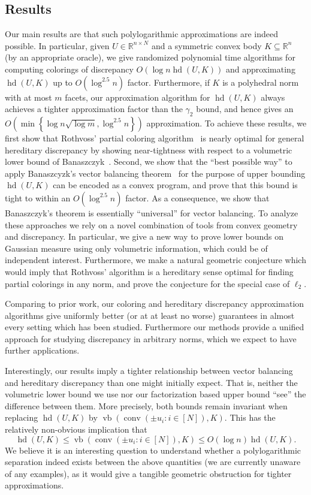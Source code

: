 \documentclass[11pt]{article}
\newcommand{\R}{{\mathbb{R}}}
\newcommand{\set}[1]{\left\{ #1 \right\}}
\DeclareMathOperator{\hd}{hd}
\DeclareMathOperator{\vb}{vb}
\DeclareMathOperator{\conv}{conv}
\begin{document}
\subsection{Results} 
Our main results are that such polylogarithmic approximations are indeed
possible. In particular, given $U \in \R^{n \times N}$ and a symmetric convex
body $K \subseteq \R^n$ (by an appropriate oracle), we give randomized
polynomial time algorithms for computing colorings of discrepancy $O(\log n
\hd(U,K))$ and approximating $\hd(U,K)$ up to $O(\log^{2.5} n)$ factor.
Furthermore, if $K$ is a polyhedral norm with at most $m$ facets, our
approximation algorithm for $\hd(U,K)$ always achieves a tighter approximation
factor than the $\gamma_2$ bound, and hence gives an $O(\min \set{\log n
\sqrt{\log m}, \log^{2.5} n})$ approximation. To achieve these results, we first
show that Rothvoss' partial coloring algorithm~\cite{rothvoss-giann} is nearly
optimal for general hereditary discrepancy by showing near-tightness with
respect to a volumetric lower bound of Banaszczyk~\cite{Bana93}. Second, we show
that the ``best possible way'' to apply Banaszcyzk's vector balancing
theorem~\cite{bana} for the purpose of upper bounding $\hd(U,K)$ can be
encoded as a convex program, and prove that this bound is tight to within an
$O(\log^{2.5} n)$ factor. As a consequence, we show that Banaszczyk's theorem is
essentially ``universal'' for vector balancing. To analyze these approaches we
rely on a novel combination of tools from convex geometry and discrepancy. In
particular, we give a new way to prove lower bounds on Gaussian measure using
only volumetric information, which could be of independent interest.
Furthermore, we make a natural geometric conjecture which would imply that
Rothvoss' algorithm is a hereditary sense optimal for finding partial colorings
in any norm, and prove the conjecture for the special case of $\ell_2$.

Comparing to prior work, our coloring and hereditary discrepancy
approximation algorithms give uniformly better (or at at least no worse)
guarantees in almost every setting which has been studied. Furthermore our
methods provide a unified approach for studying discrepancy in arbitrary norms,
which we expect to have further applications.

Interestingly, our results imply a tighter relationship between vector balancing
and hereditary discrepancy than one might initially expect. That is,
neither the volumetric lower bound we use nor our factorization based upper
bound ``see'' the difference between them. More precisely, both bounds remain
invariant when replacing $\hd(U,K)$ by $\vb(\conv(\pm u_i: i \in [N]),K)$. This
has the relatively non-obvious implication that 
\begin{equation}
\label{eq:hd-to-vb}
\hd(U,K) \leq \vb(\conv(\pm u_i: i \in [N]),K) \leq O(\log n) \hd(U,K).
\end{equation}
We believe it is an interesting question to understand whether a polylogarithmic
separation indeed exists between the above quantities (we are currently unaware
of any examples), as it would give a tangible geometric obstruction for tighter
approximations.    
\end{document}
